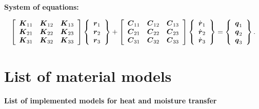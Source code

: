 {\bf System of equations:}

\begin{eqnarray}
\left[ \begin{array}{ccc}
\mbox{\boldmath$K$}_{11} & \mbox{\boldmath$K$}_{12} & \mbox{\boldmath$K$}_{13} \\
\mbox{\boldmath$K$}_{21} & \mbox{\boldmath$K$}_{22} & \mbox{\boldmath$K$}_{23} \\
\mbox{\boldmath$K$}_{31} & \mbox{\boldmath$K$}_{32} & \mbox{\boldmath$K$}_{33}
\end{array} \right]
\left\{ \begin{array}{c}
\mbox{\boldmath$r$}_1 \\
\mbox{\boldmath$r$}_2 \\
\mbox{\boldmath$r$}_3
\end{array} \right\} + 
\left[ \begin{array}{ccc}
\mbox{\boldmath$C$}_{11} & \mbox{\boldmath$C$}_{12} & \mbox{\boldmath$C$}_{13} \\
\mbox{\boldmath$C$}_{21} & \mbox{\boldmath$C$}_{22} & \mbox{\boldmath$C$}_{23} \\
\mbox{\boldmath$C$}_{31} & \mbox{\boldmath$C$}_{32} & \mbox{\boldmath$C$}_{33}
\end{array} \right]
\left\{ \begin{array}{c}
\dot{\mbox{\boldmath$r$}}_1 \\
\dot{\mbox{\boldmath$r$}}_2 \\
\dot{\mbox{\boldmath$r$}}_3
\end{array} \right\} = 
\left\{ \begin{array}{c}
\mbox{\boldmath$q$}_1 \\
\mbox{\boldmath$q$}_2 \\
\mbox{\boldmath$q$}_3
\end{array} \right\}.
\end{eqnarray}



\section{List of material models}
{\bf List of implemented models for heat and moisture transfer}

